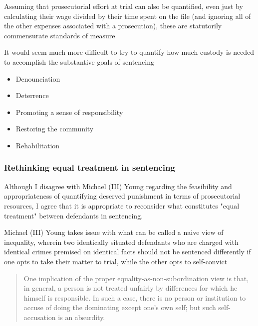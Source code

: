 Assuming that prosecutorial effort at trial can also be quantified, even just by calculating their wage divided by their time spent on the file (and ignoring all of the other expenses associated with a prosecution), these are statutorily commensurate standards of measure

It would seem much more difficult to try to quantify how much custody is needed to accomplish the substantive goals of sentencing
\begin{itemize}
    \item Denounciation
    \item Deterrence
    \item Promoting a sense of responsibility
    \item Restoring the community
    \item Rehabilitation
\end{itemize}

\subsubsection{Rethinking equal treatment in sentencing}

Although I disagree with Michael (III) Young regarding the feasibility and appropriateness of quantifying deserved punishment in terms of prosecutorial resources, I agree that it is appropriate to reconsider what constitutes "equal treatment" between defendants in sentencing.

Michael (III) Young takes issue with what can be called a naive view of inequality, wherein two identically situated defendants who are charged with identical crimes premised on identical facts should not be sentenced differently if one opts to take their matter to trial, while the other opts to self-convict

\begin{quote}
    One implication of the proper equality-as-non-subordination view is that, in general, a person is not treated unfairly by differences for which he himself is responsible. In such a case, there is no person or institution to accuse of doing the dominating except one's own self; but such self-accusation is an absurdity.
\end{quote}

